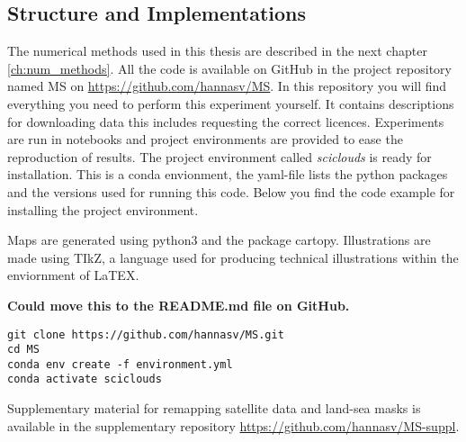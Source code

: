 \subsection{Structure and Implementations}
The numerical methods used in this thesis are described in the next chapter \ref{ch:num_methods}. All the code is available on GitHub in the project repository named MS on \href{https://github.com/hannasv/MS}{https://github.com/hannasv/MS}. In this repository you will find everything you need to perform this experiment yourself. It contains descriptions for downloading data this includes requesting the correct licences. Experiments are run in notebooks and project environments are provided to ease the reproduction of results. The project environment called \textit{sciclouds} is ready for installation. This is a conda envionment, the yaml-file lists the python packages and the versions used for running this code. Below you find the code example for installing the project environment.

Maps are generated using python3 and the package cartopy. Illustrations are made using TIkZ, a language used for producing technical illustrations within the enviornment of LaTEX.

\textbf{Could move this to the README.md file on GitHub.}
\begin{verbatim}
git clone https://github.com/hannasv/MS.git
cd MS
conda env create -f environment.yml
conda activate sciclouds
\end{verbatim}
Supplementary material for remapping satellite data and land-sea masks is available in the supplementary repository \href{https://github.com/hannasv/MS-suppl}{https://github.com/hannasv/MS-suppl}.